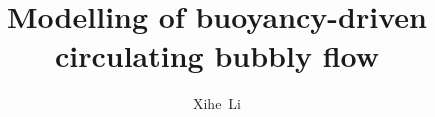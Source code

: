 \documentclass{tudelft-report}
\begin{document}
\frontmatter



\title[tudelft-white]{Modelling of buoyancy-driven circulating bubbly flow}
\author[tudelft-white]{Xihe\ Li}










\tableofcontents

\listoffigures
 

\mainmatter










\appendix







%

\end{document}
